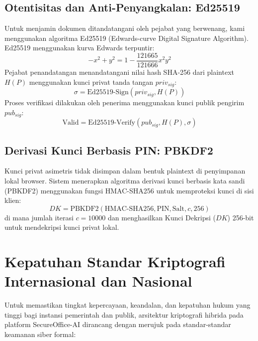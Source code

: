 \documentclass[conference]{IEEEtran}
\begin{document}
\subsection{Otentisitas dan Anti-Penyangkalan: Ed25519}
Untuk menjamin dokumen ditandatangani oleh pejabat yang berwenang, kami menggunakan algoritma Ed25519 (Edwards-curve Digital Signature Algorithm). Ed25519 menggunakan kurva Edwards terpuntir:
\begin{equation}
-x^2 + y^2 = 1 - \frac{121665}{121666}x^2y^2
\end{equation}
Pejabat penandatangan menandatangani nilai hash SHA-256 dari plaintext $H(P)$ menggunakan kunci privat tanda tangan $priv_{sig}$:
\begin{equation}
\sigma = \text{Ed25519-Sign}(priv_{sig}, H(P))
\end{equation}
Proses verifikasi dilakukan oleh penerima menggunakan kunci publik pengirim $pub_{sig}$:
\begin{equation}
\text{Valid} = \text{Ed25519-Verify}(pub_{sig}, H(P), \sigma)
\end{equation}

\subsection{Derivasi Kunci Berbasis PIN: PBKDF2}
Kunci privat asimetris tidak disimpan dalam bentuk plaintext di penyimpanan lokal browser. Sistem menerapkan algoritma derivasi kunci berbasis kata sandi (PBKDF2) menggunakan fungsi HMAC-SHA256 untuk memproteksi kunci di sisi klien:
\begin{equation}
DK = \text{PBKDF2}(\text{HMAC-SHA256}, \text{PIN}, \text{Salt}, c, 256)
\end{equation}
di mana jumlah iterasi $c = 10000$ dan menghasilkan Kunci Dekripsi ($DK$) 256-bit untuk mendekripsi kunci privat lokal.

\section{Kepatuhan Standar Kriptografi Internasional dan Nasional}
Untuk memastikan tingkat kepercayaan, keandalan, dan kepatuhan hukum yang tinggi bagi instansi pemerintah dan publik, arsitektur kriptografi hibrida pada platform SecureOffice-AI dirancang dengan merujuk pada standar-standar keamanan siber formal:
\end{document}
